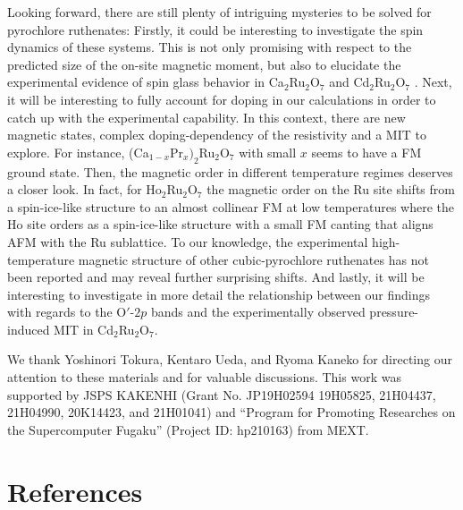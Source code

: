 \documentclass[10pt]{iopart}
\begin{document}
Looking forward, there are still plenty of intriguing mysteries to be solved for pyrochlore ruthenates:
Firstly, it could be interesting to investigate the spin dynamics of these systems. This is not only promising with respect to the predicted size of the on-site magnetic moment, but also to elucidate the experimental evidence of spin glass behavior in Ca$_2$Ru$_2$O$_7$ \cite{taniguchi2009spin, miyazaki2010magnetic} and Cd$_2$Ru$_2$O$_7$ \cite{miyazaki2010magnetic}. Next, it will be interesting to fully account for doping in our calculations in order to catch up with the experimental capability. In this context, there are new magnetic states, complex doping-dependency of the resistivity and a MIT to explore. For instance, (Ca$_{1-x}$Pr$_x)_2$Ru$_2$O$_7$ with small $x$ seems to have a FM ground state. Then, the magnetic order in different temperature regimes deserves a closer look. In fact, for Ho$_2$Ru$_2$O$_7$ the magnetic order on the Ru site shifts
from a spin-ice-like structure to an almost collinear FM at low temperatures where the Ho site orders as a spin-ice-like structure with a small FM canting that aligns AFM with the Ru sublattice. To our knowledge, the experimental high-temperature magnetic structure of other cubic-pyrochlore ruthenates has not been reported and may reveal further surprising shifts. And lastly, it will be interesting to investigate in more detail the relationship between our findings with regards to the O$'$-$2p$ bands and the experimentally observed pressure-induced MIT in Cd$_2$Ru$_2$O$_7$.


\ack
We thank Yoshinori Tokura, Kentaro Ueda, and Ryoma Kaneko for directing our attention to these materials and for valuable discussions.
This work was supported by JSPS KAKENHI (Grant No. JP19H02594 19H05825, 21H04437, 21H04990, 20K14423, and 21H01041) and “Program for Promoting Researches on the Supercomputer Fugaku” (Project ID: hp210163) from  MEXT.

\section*{References}


\end{document}
